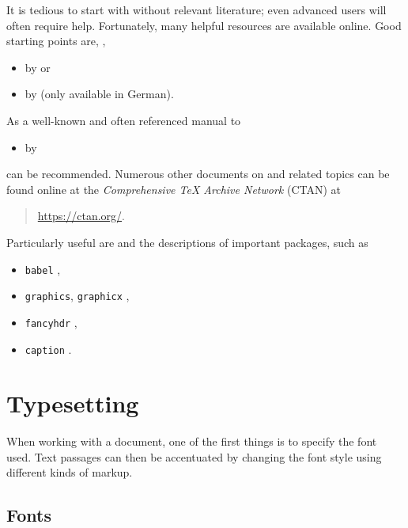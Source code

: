 It is tedious to start with \latex without relevant literature; even advanced
users will often require help. Fortunately, many helpful resources are available
online. Good starting points are, \eg,
%
\begin{itemize}
    \item {} by \textcite{Oetiker2021} or
	\item {} by \textcite{Daniel2018} (only available in German).

\end{itemize}
%
\noindent
As a well-known and often referenced manual to \latex 
%
\begin{itemize}
    \item {} by \textcite{Kopka2003}
\end{itemize}
%
can be recommended. Numerous other documents on \latex and related topics can be
found online at the \emph{Comprehensive TeX Archive Network} (CTAN) at
%
\begin{quote}
    \url{https://ctan.org/}.
\end{quote}
%
Particularly useful are  \cite{Pakin2021} and the
descriptions of important \latex packages, such as
%
\begin{itemize}
    \item[] \texttt{babel} \cite{Bezos2023},
    \item[] \texttt{graphics}, \texttt{graphicx} \cite{Carlisle2021},
    \item[] \texttt{fancyhdr} \cite{Oostrum2022},
    \item[] \texttt{caption} \cite{Sommerfeldt2023}.
\end{itemize}


\section{Typesetting}

When working with a \latex document, one of the first things is to specify the
font used. Text passages can then be accentuated by changing the font style
using different kinds of markup.

\subsection{Fonts}


